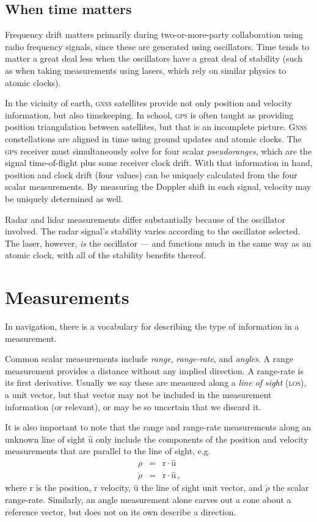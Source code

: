 \documentclass[12pt]{article}
\newcommand*\vect[1]{\mathrm{#1}}
\begin{document}
\subsection{When time matters}

Frequency drift matters primarily during two-or-more-party collaboration using radio frequency signals, since these are generated using oscillators. Time tends to matter a great deal less when the oscillators have a great deal of stability (such as when taking measurements using lasers, which rely on similar physics to atomic clocks).

In the vicinity of earth, \textsc{gnss} satellites provide not only position and velocity information, but also timekeeping. In school, \textsc{gps} is often taught as providing position triangulation between satellites, but that is an incomplete picture. \textsc{Gnss} constellations are aligned in time using ground updates and atomic clocks. The \textsc{gps} receiver must simultaneously solve for four scalar \textit{pseudoranges}, which are the signal time-of-flight plus some receiver clock drift. With that information in hand, position and clock drift (four values) can be uniquely calculated from the four scalar measurements. By measuring the Doppler shift in each signal, velocity may be uniquely determined as well.

Radar and lidar measurements differ substantially because of the oscillator involved. The radar signal's stability varies according to the oscillator selected. The laser, however, \textit{is} the oscillator --- and functions much in the same way as an atomic clock, with all of the stability benefits thereof.

\section{Measurements}
In navigation, there is a vocabulary for describing the type of information in a measurement.

Common scalar measurements include \textit{range}, \textit{range-rate}, and \textit{angles}. A range measurement provides a distance without any implied direction. A range-rate is its first derivative. Usually we say these are measured along a \textit{line of sight} (\textsc{los}), a unit vector, but that vector may not be included in the measurement information (or relevant), or may be so uncertain that we discard it.

It is also important to note that the range and range-rate measurements along an unknown line of sight $\hat{\vect{u}}$ only include the components of the position and velocity measurements that are parallel to the line of sight, e.g.
\begin{eqnarray}
\rho &=& \vect{r} \cdot \hat{\vect{u}} \\
\dot\rho &=& \dot{\vect{r}} \cdot \hat{\vect{u}}\,\text{,}
\end{eqnarray}
where $\vect{r}$ is the position, $\dot{\vect{r}}$ velocity, $\hat{\vect{u}}$ the line of sight unit vector, and $\dot\rho$ the scalar range-rate. Similarly, an angle measurement alone carves out a cone about a reference vector, but does not on its own describe a direction.
\end{document}
